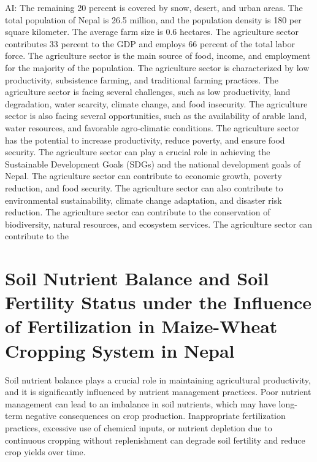 \documentclass[a4paper,12pt]{article}
\begin{document}
AI: The remaining 20 percent is covered by snow, desert, and urban areas. The total population of Nepal is 26.5 million, and the population density is 180 per square kilometer. The average farm size is 0.6 hectares. The agriculture sector contributes 33 percent to the GDP and employs 66 percent of the total labor force. The agriculture sector is the main source of food, income, and employment for the majority of the population. The agriculture sector is characterized by low productivity, subsistence farming, and traditional farming practices. The agriculture sector is facing several challenges, such as low productivity, land degradation, water scarcity, climate change, and food insecurity. The agriculture sector is also facing several opportunities, such as the availability of arable land, water resources, and favorable agro-climatic conditions. The agriculture sector has the potential to increase productivity, reduce poverty, and ensure food security. The agriculture sector can play a crucial role in achieving the Sustainable Development Goals (SDGs) and the national development goals of Nepal. The agriculture sector can contribute to economic growth, poverty reduction, and food security. The agriculture sector can also contribute to environmental sustainability, climate change adaptation, and disaster risk reduction. The agriculture sector can contribute to the conservation of biodiversity, natural resources, and ecosystem services. The agriculture sector can contribute to the

\section{Soil Nutrient Balance and Soil Fertility Status under the Influence of Fertilization in Maize-Wheat Cropping System in Nepal}
\parencite{rawalSoilNutrientBalance2022}

Soil nutrient balance plays a crucial role in maintaining agricultural productivity, and it is significantly influenced by nutrient management practices. Poor nutrient management can lead to an imbalance in soil nutrients, which may have long-term negative consequences on crop production. Inappropriate fertilization practices, excessive use of chemical inputs, or nutrient depletion due to continuous cropping without replenishment can degrade soil fertility and reduce crop yields over time.
\end{document}
